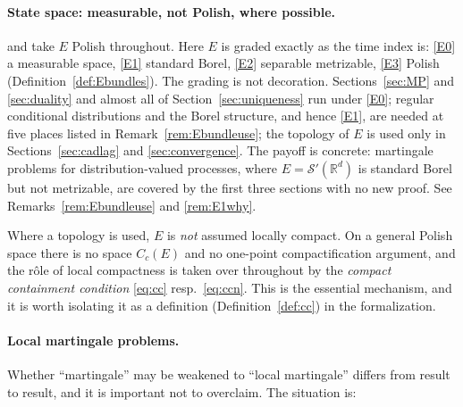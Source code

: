 \documentclass[11pt,a4paper]{article}
\theoremstyle{plain}
\theoremstyle{definition}
\theoremstyle{remark}
\newcommand{\R}{\mathbb{R}}
\newcommand{\EK}{\cite{EK86}}
\newcommand{\CPS}{\cite{CPS23}}
\begin{document}
\paragraph{State space: measurable, not Polish, where possible.}
\EK{} and \CPS{} take $E$ Polish throughout.  Here $E$ is graded exactly as the
time index is: \eqref{E0} a measurable space, \eqref{E1} standard Borel, \eqref{E2} separable
metrizable, \eqref{E3} Polish (Definition~\ref{def:Ebundles}).  The grading is not
decoration.  Sections~\ref{sec:MP} and \ref{sec:duality} and almost all of
Section~\ref{sec:uniqueness} run under \eqref{E0}; regular conditional distributions
and the Borel structure, and hence \eqref{E1}, are needed at five places listed in
Remark~\ref{rem:Ebundleuse}; the topology of $E$ is used only in
Sections~\ref{sec:cadlag} and \ref{sec:convergence}.  The payoff is
concrete: martingale problems for distribution-valued processes, where
$E = \mathcal{S}'(\R^d)$ is standard Borel but not metrizable, are covered by the
first three sections with no new proof.  See Remarks~\ref{rem:Ebundleuse} and
\ref{rem:E1why}.

Where a topology is used, $E$ is \emph{not} assumed locally compact.  On a
general Polish space there is no space $C_c(E)$ and no one-point
compactification argument, and the r\^ole of local compactness is taken over
throughout by the \emph{compact containment condition} \eqref{eq:cc} resp.\
\eqref{eq:ccn}.  This is the essential mechanism, and it is worth isolating it as
a definition (Definition~\ref{def:cc}) in the formalization.

\paragraph{Local martingale problems.}
Whether ``martingale'' may be weakened to ``local martingale'' differs from
result to result, and it is important not to overclaim.  The situation is:
\end{document}
